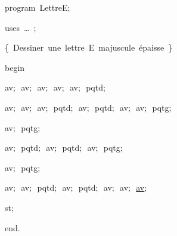 
{
\parindent {}
\medskip

\carrenoir
\vspace{\neglskip}\mbox{\blc  \idt  \mcl program\idt \ LettreE$;$
}\par 
\vspace{\neglskip}\mbox{\blc \blk\idt \mcl uses\idt \ \ldots\ $;$
}\par 
\medskip

\vspace{\neglskip}\mbox{\blc  \blk\idt  \cmt  \{\ Dessiner\ une\ lettre\ E\ majuscule\ épaisse\ \}\idt }\par 
\medskip

\vspace{\neglskip}\mbox{\blc  \idt  \mcl begin\idt }\par 
\vspace{\neglskip}\mbox{\blc  \blk\idt  av$;$\ av$;$\ av$;$\ av$;$\ av$;$\ pqtd$;$}\par 
\vspace{\neglskip}\mbox{\blc  \blk\idt  av$;$\ av$;$\ av$;$\ pqtd$;$\ av$;$\ pqtd$;$\ av$;$\ av$;$\ pqt\underline{g}$;$}\par 
\vspace{\neglskip}\mbox{\blc  \blk\idt  av$;$\ pqtg$;$}\par 
\vspace{\neglskip}\mbox{\blc  \blk\idt  av$;$\ pqtd$;$\ av$;$\ pqtd$;$\ av$;$\ pqtg$;$}\par 
\vspace{\neglskip}\mbox{\blc  \blk\idt  av$;$\ pqtg$;$}\par 
\vspace{\neglskip}\mbox{\blc  \blk\idt  av$;$\ av$;$\ pqtd$;$\ av$;$\ pqtd$;$\ av$;$\ av$;$\ \underline{av$;$}}\par 
\vspace{\neglskip}\mbox{\blc  \blk\idt  st$;$}\par 
\vspace{\neglskip}\mbox{\blc  \idt  \mcl end\idt $.$}\par 
\medskip


\medskip }

